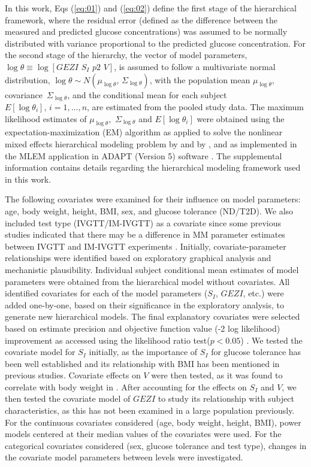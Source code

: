 \documentclass[utf8]{frontiersSCNS} %
\begin{document}
In this work, Eqs (\ref{eq:01}) and (\ref{eq:02}) define the first stage of the hierarchical framework, where the residual error (defined as the difference between the measured and predicted glucose concentrations) was assumed to be normally distributed with variance proportional to the predicted glucose concentration. For the second stage of the hierarchy, the vector of model parameters, $\log \theta  \equiv \log \left[ {GEZI\,\,{S_I}\,\,p2\,\,V} \right]$, is assumed to follow a multivariate normal distribution, $\log \theta  \sim N\left( {{\mu_{\log \theta }},\,{\Sigma _{\log \theta }}} \right)$, with the population mean   ${\mu _{\log \theta }}$, covariance $\,{\Sigma _{\log \theta }}$, and the conditional mean for each subject $E\left[ {\log {\theta _i}} \right],\,i = 1, \ldots ,n$, are estimated from the pooled study data. The maximum likelihood estimates of   ${\mu _{\log \theta }}$, $\,{\Sigma _{\log \theta }}$ and $E\left[ {\log {\theta _i}} \right]$ were obtained using the expectation-maximization (EM) algorithm as applied to solve the nonlinear mixed effects hierarchical modeling problem by \citet{Schumitzky1995EMAnalysis} and  by \citet{walker_1996}, and as implemented in the MLEM application in ADAPT (Version 5) software \citep{AdaptUserGuide}. The supplemental information contains details regarding the hierarchical modeling framework used in this work.

The following covariates were examined for their influence on model parameters: age, body weight, height, BMI, sex, and glucose tolerance (ND/T2D). We also included test type (IVGTT/IM-IVGTT) as a covariate since some previous studies indicated that there may be a difference in MM parameter estimates between IVGTT and IM-IVGTT experiments \citep{IM_IV_1998}. Initially, covariate-parameter relationships were identified based on exploratory graphical analysis and mechanistic plausibility. Individual subject conditional mean estimates of model parameters were obtained from the hierarchical model without covariates. All identified covariates for each of the model parameters ($S_I$, $GEZI$, etc.) were added one-by-one, based on their significance in the exploratory analysis, to generate new hierarchical models. The final explanatory covariates were selected based on estimate precision and objective function value (-2 log likelihood) improvement as accessed using the likelihood ratio test($p<0.05$) \citep{Bonate2011}. We tested the covariate model for $S_I$ initially, as the importance of $S_I$ for glucose tolerance has been well established and its relationship with BMI has been mentioned in previous studies. Covariate effects on $V$ were then tested, as it was found to correlate with body weight in \citet{Denti2010}. After accounting for the effects on $S_I$ and $V$, we then tested the covariate model of $GEZI$ to study its relationship with subject characteristics, as this has not been examined in a large population previously. For the continuous covariates considered (age, body weight, height, BMI), power models centered at their median values of the covariates were used. For the categorical covariates considered (sex, glucose tolerance and test type), changes in the covariate model parameters between levels were investigated. 
\end{document}
